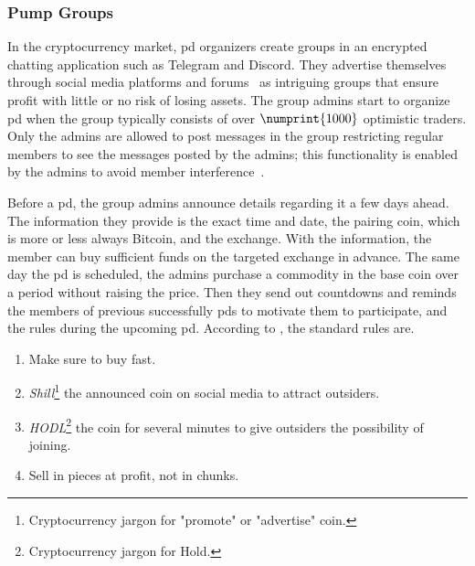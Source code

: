 \subsubsection{Pump Groups}\label{sec:pump_groups}
In the cryptocurrency market, \ac{pd} organizers create groups in an encrypted chatting application such as Telegram and Discord. They advertise themselves through social media platforms and forums~\cite{P&D_scheme} as intriguing groups that ensure profit with little or no risk of losing assets. The group admins start to organize \ac{pd} when the group typically consists of over $\numprint{1000}$ optimistic traders. Only the admins are allowed to post messages in the group restricting regular members to see the messages posted by the admins; this functionality is enabled by the admins to avoid member interference~\cite{P&D_anatomy}.

Before a \ac{pd}, the group admins announce details regarding it a few days ahead. The information they provide is the exact time and date, the pairing coin, which is more or less always Bitcoin, and the exchange. With the information, the member can buy sufficient funds on the targeted exchange in advance. The same day the \ac{pd} is scheduled, the admins purchase a commodity in the base coin over a period without raising the price. Then they send out countdowns and reminds the members of previous successfully \acp{pd} to motivate them to participate, and the rules during the upcoming \ac{pd}. According to \cite{P&D_anatomy}, the standard rules are.

\begin{enumerate}
    \item Make sure to buy fast.
    \item \emph{Shill}\footnote{Cryptocurrency jargon for "promote" or "advertise" coin.} the announced coin on social media to attract outsiders.
    \item \emph{HODL}\footnote{Cryptocurrency jargon for Hold.} the coin for several minutes to give outsiders the possibility of joining.
    \item Sell in pieces at profit, not in chunks.
\end{enumerate}

